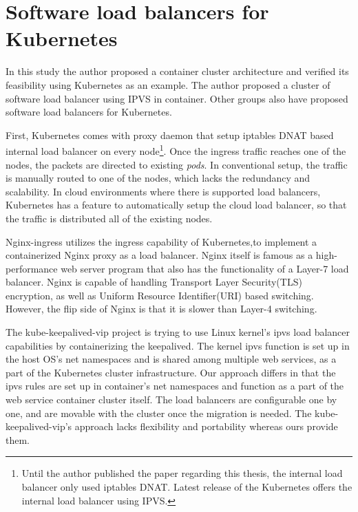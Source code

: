 \section{Software load balancers for Kubernetes}

In this study the author proposed a container cluster architecture and verified its feasibility using Kubernetes as an example.
The author proposed a cluster of software load balancer using IPVS in container.
Other groups also have proposed software load balancers for Kubernetes.

First, Kubernetes comes with proxy daemon that setup iptables DNAT based internal load balancer on every node\footnote{
Until the author published the paper \cite{takahashi2018portable} regarding this thesis, the internal load balancer only used iptables DNAT.
Latest release of the Kubernetes offers the internal load balancer using IPVS.
}.
%
Once the ingress traffic reaches one of the nodes, the packets are directed to existing {\em pods}.
In conventional setup, the traffic is manually routed to one of the nodes, which lacks the redundancy and scalability.
In cloud environments where there is supported load balancers, Kubernetes has a feature to automatically setup the cloud load balancer, so that the traffic is distributed all of the existing nodes. 

Nginx-ingress\cite{Pleshakov2016,NginxInc2016} utilizes the ingress\cite{K8sIngress2017} capability of Kubernetes,to implement a containerized Nginx proxy as a load balancer.
Nginx itself is famous as a high-performance web server program that also has the functionality of a Layer-7 load balancer.
Nginx is capable of handling Transport Layer Security(TLS) encryption, as well as Uniform Resource Identifier(URI) based switching.
However, the flip side of Nginx is that it is slower than Layer-4 switching.

The kube-keepalived-vip\cite{Prashanth2016} project is trying to use Linux kernel's ipvs\cite{Zhang2000} 
load balancer capabilities by containerizing the keepalived\cite{ACassen2016}.
The kernel ipvs function is set up in the host OS's net namespaces and is shared among multiple web services, as a part of the Kubernetes cluster infrastructure.
Our approach differs in that the ipvs rules are set up in container's net namespaces 
and function as a part of the web service container cluster itself.
The load balancers are configurable one by one, and are  movable with the cluster once the migration is needed.
The kube-keepalived-vip's approach lacks flexibility and portability whereas ours provide them.

